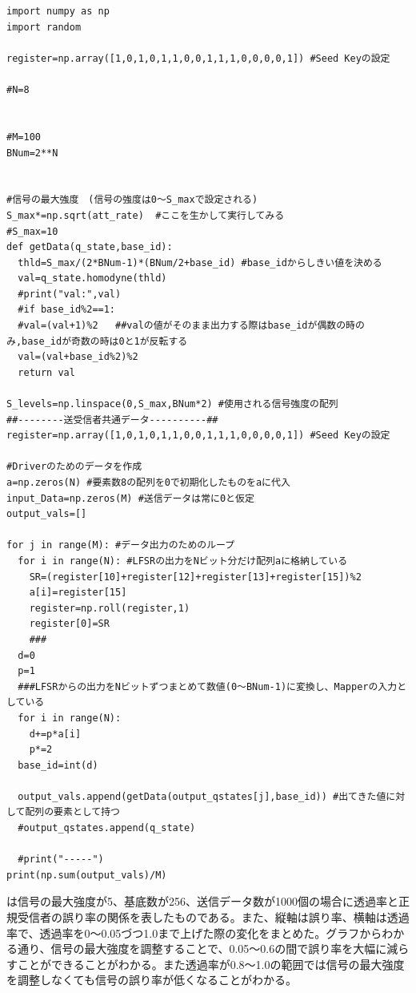 \begin{lstlisting}[caption=受信側のプログラム（最大強度の調整あり）,label=program4]


import numpy as np
import random

register=np.array([1,0,1,0,1,1,0,0,1,1,1,0,0,0,0,1]) #Seed Keyの設定

#N=8 


#M=100 
BNum=2**N 


#信号の最大強度　(信号の強度は0～S_maxで設定される)
S_max*=np.sqrt(att_rate)  #ここを生かして実行してみる
#S_max=10
def getData(q_state,base_id):
  thld=S_max/(2*BNum-1)*(BNum/2+base_id) #base_idからしきい値を決める
  val=q_state.homodyne(thld)
  #print("val:",val)
  #if base_id%2==1:
  #val=(val+1)%2   ##valの値がそのまま出力する際はbase_idが偶数の時のみ,base_idが奇数の時は0と1が反転する
  val=(val+base_id%2)%2
  return val

S_levels=np.linspace(0,S_max,BNum*2) #使用される信号強度の配列
##--------送受信者共通データ----------##
register=np.array([1,0,1,0,1,1,0,0,1,1,1,0,0,0,0,1]) #Seed Keyの設定

#Driverのためのデータを作成
a=np.zeros(N) #要素数8の配列を0で初期化したものをaに代入
input_Data=np.zeros(M) #送信データは常に0と仮定
output_vals=[]

for j in range(M): #データ出力のためのループ
  for i in range(N): #LFSRの出力をNビット分だけ配列aに格納している
    SR=(register[10]+register[12]+register[13]+register[15])%2 
    a[i]=register[15] 
    register=np.roll(register,1) 
    register[0]=SR
    ###
  d=0
  p=1
  ###LFSRからの出力をNビットずつまとめて数値(0～BNum-1)に変換し、Mapperの入力としている
  for i in range(N):
    d+=p*a[i]
    p*=2 
  base_id=int(d)

  output_vals.append(getData(output_qstates[j],base_id)) #出てきた値に対して配列の要素として持つ
  #output_qstates.append(q_state)
  
  #print("-----")
print(np.sum(output_vals)/M)

\end{lstlisting}



は信号の最大強度が5、基底数が256、送信データ数が1000個の場合に透過率と正規受信者の誤り率の関係を表したものである。また、縦軸は誤り率、横軸は透過率で、透過率を0〜0.05づつ1.0まで上げた際の変化をまとめた。グラフからわかる通り、信号の最大強度を調整することで、0.05〜0.6の間で誤り率を大幅に減らすことができることがわかる。また透過率が0.8～1.0の範囲では信号の最大強度を調整しなくても信号の誤り率が低くなることがわかる。

